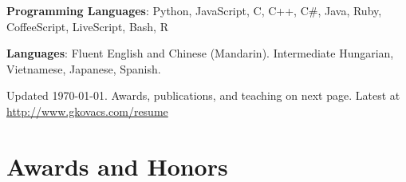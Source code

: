 \documentclass[margin,line]{resume}
\begin{document}
\begin{resume}
\textbf{Programming Languages}: Python, JavaScript, C, C++, C\#, Java, Ruby, CoffeeScript, LiveScript, Bash, R

\vspace{-4mm}

\textbf{Languages}: Fluent English and Chinese (Mandarin). Intermediate Hungarian, Vietnamese, Japanese, Spanish.

\vspace{-3mm}

\begin{small}
\begin{center}
Updated \today. Awards, publications, and teaching on next page. Latest at \href{http://www.gkovacs.com/resume.pdf}{http://www.gkovacs.com/resume}
\end{center}
\end{small}

\pagebreak





\section{\mysidestyle Awards and Honors}


\end{resume}
\end{document}
